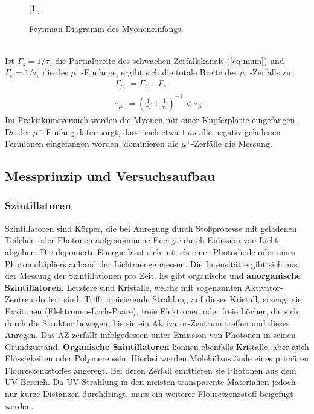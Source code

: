 		\begin{figure}[ht]
			\centering
			\scalebox{1.}[1.]{
			
			}
			\caption{Feynman-Diagramm des Myoneneinfangs.}
			\label{fig:myoneinfang}	
		\end{figure}
	\ \\
	Ist $\Gamma_z = 1/\tau_z$ die Partialbreite  des schwachen Zerfallskanals (\ref{eq:mum}) und $\Gamma_e=1/\tau_e$ die des $\mu^-$-Einfangs, ergibt sich die totale Breite des $\mu^-$-Zerfalls zu:
		\begin{align}
			&\Gamma_{\mu^-} = \Gamma_z + \Gamma_e\\
			&\tau_{\mu^-} = \left(\frac{1}{\tau_z} + \frac{1}{\tau_e}\right)^{-1} < \tau_{\mu^+}  
		\end{align}
	Im Praktikumsversuch werden die Myonen mit einer Kupferplatte eingefangen. Da der $\mu^-$-Einfang dafür sorgt, dass nach etwa $1\ \unit{\mu s}$ alle negativ geladenen Fermionen eingefangen worden, dominieren die $\mu^+$-Zerfälle die Messung. 
	
	\subsection{Messprinzip und Versuchsaufbau}
        \subsubsection{Szintillatoren}
            Szintillatoren sind Körper, die bei Anregung durch Stoßprozesse mit geladenen Teilchen oder Photonen aufgenommene Energie durch Emission von Licht abgeben. Die deponierte Energie lässt sich mittels einer Photodiode oder eines Photomultipliers anhand der Lichtmenge messen. Die Intensität ergibt sich aus der Messung der Szintillationen pro Zeit.
            Es gibt organische und \textbf{anorganische Szintillatoren}. Letztere sind Kristalle, welche mit sogenannten Aktivator-Zentren dotiert sind. Trifft ionisierende Strahlung auf dieses Kristall, erzeugt sie Exzitonen (Elektronen-Loch-Paare), freie Elektronen oder freie Löcher, die sich durch die Struktur bewegen, bis sie ein Aktivator-Zentrum treffen und dieses Anregen. Das AZ zerfällt infolgedessen unter Emission von Photonen in seinen Grundzustand. 
            \textbf{Organische Szintillatoren} können ebenfalls Kristalle, aber auch Flüssigkeiten oder Polymere sein. Hierbei werden Molekülzustände eines primären Floureszenzstoffes angeregt. Bei deren Zerfall emittieren sie Photonen aus dem UV-Bereich. Da UV-Strahlung in den meisten transparente Materialien jedoch nur kurze Distanzen durchdringt, muss ein weiterer Floureszenzstoff beigefügt werden.
